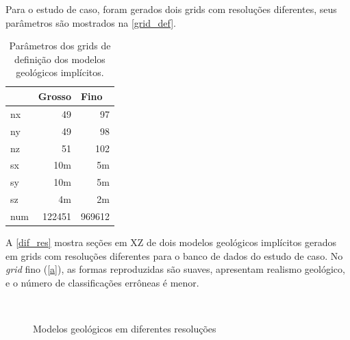 Para o estudo de caso, foram gerados dois grids com resoluções diferentes, seus parâmetros são mostrados na \autoref{grid_def}.

\begin{table}[H]
\centering
\begin{tabular}{lrr}
 & \multicolumn{1}{l}{Grosso} & \multicolumn{1}{l}{Fino} \\ \hline
nx & 49 & 97 \\
ny & 49 & 98 \\
nz & 51 & 102 \\
sx & 10m & 5m \\
sy & 10m & 5m \\
sz & 4m & 2m \\
num & 122451 & 969612 \\ \hline
\end{tabular}
\caption{Parâmetros dos grids de definição dos modelos geológicos implícitos.} \label{grid_def}
\end{table}

A \autoref{dif_res} mostra seções em XZ de dois modelos geológicos implícitos gerados em grids com resoluções diferentes para o banco de dados do estudo de caso. No \textit{grid} fino (\autoref{a}), as formas reproduzidas são suaves, apresentam realismo geológico, e o número de classificações errôneas é menor.

\begin{figure}[H]
\caption{Modelos geológicos em diferentes resoluções} 
\label{dif_res}
\begin{center}
\\
\end{center}
\begin{center}
\end{center}
\end{figure}

